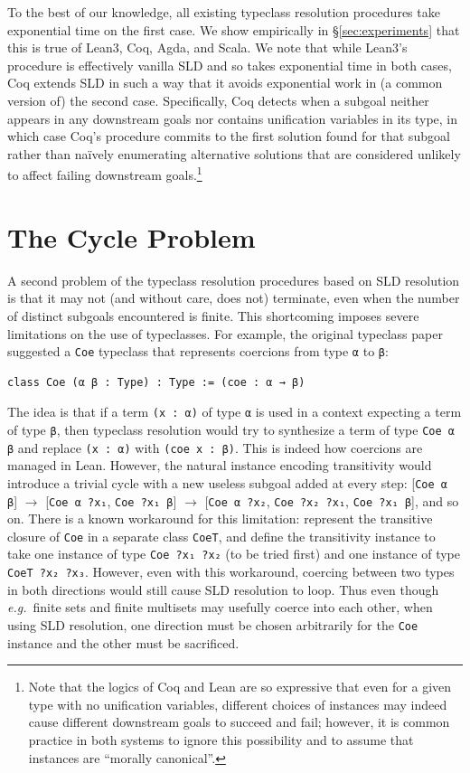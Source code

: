 \documentclass[runningheads]{llncs}
\newcommand\eg{\emph{e.g.}\ }
\begin{document}
To the best of our knowledge, all existing typeclass resolution procedures take exponential time on the first case.
We show empirically in \S\ref{sec:experiments} that this is true of Lean3, Coq, Agda, and Scala.
We note that while Lean3's procedure is effectively vanilla SLD and so takes exponential time in both cases,
Coq extends SLD in such a way that it avoids exponential work in (a common version of) the second case.
Specifically, Coq detects when a subgoal neither appears in any downstream goals nor contains unification variables in its type, in which
case Coq's procedure commits to the first solution found for that subgoal rather than na\"{i}vely enumerating alternative solutions that are considered unlikely to affect failing
downstream goals.\footnote{Note that the logics of Coq and Lean are so expressive that even for a given type with no unification variables,
  different choices of instances may indeed cause different downstream goals to succeed and fail;
however, it is common practice in both systems to ignore this possibility and to assume that instances are ``morally canonical''.}

\section{The Cycle Problem}\label{sec:cycles}

A second problem of the typeclass resolution procedures based on SLD resolution is that it may not (and without care, does not) terminate,
even when the number of distinct subgoals encountered is finite. This shortcoming imposes severe limitations on the use of typeclasses.
For example, the original typeclass paper \cite{wadler1989make} suggested a \lstinline{Coe} typeclass that represents coercions from type \lstinline{α} to \lstinline{β}:
\begin{lstlisting}
class Coe (α β : Type) : Type := (coe : α → β)
\end{lstlisting}
The idea is that if a term \lstinline{(x : α)} of type \lstinline{α} is used in a context expecting a term of type \lstinline{β},
then typeclass resolution would try to synthesize a term of type \lstinline{Coe α β} and replace \lstinline{(x : α)} with \lstinline{(coe x : β)}.
This is indeed how coercions are managed in Lean. However, the natural instance encoding transitivity would introduce a trivial cycle with a new useless subgoal
added at every step:
[\lstinline{Coe α β}] $\to$ [\lstinline{Coe α ?x₁}, \lstinline{Coe ?x₁ β}] $\to$ [\lstinline{Coe α ?x₂}, \lstinline{Coe ?x₂ ?x₁}, \lstinline{Coe ?x₁ β}], and so on.
There is a known workaround for this limitation: represent the transitive closure of \lstinline{Coe} in a separate class \lstinline{CoeT},
and define the transitivity instance to take one instance of type \lstinline{Coe ?x₁ ?x₂} (to be tried first) and one instance of type
\lstinline{CoeT ?x₂ ?x₃}.
However, even with this workaround, coercing between two types in both directions would still cause SLD resolution to loop.
Thus even though \eg finite sets and finite multisets may usefully coerce into each other, when using SLD resolution,
one direction must be chosen arbitrarily for the \lstinline{Coe} instance and the other must be sacrificed.
\end{document}
